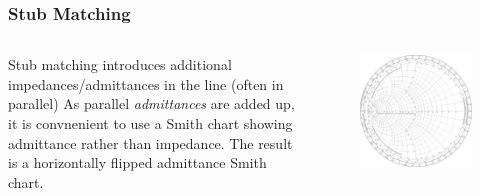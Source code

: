\documentclass[10pt, compress]{beamer}
\begin{document}
\begin{frame}
    \frametitle{Stub Matching}
\begin{columns}[T]
    \begin{column}[]{.4\textwidth}
        \begin{outline}
            \1 Stub matching introduces additional impedances/admittances in the line (often in parallel)
            \1 As parallel \textit{admittances} are added up, it is convnenient to use a Smith chart showing admittance rather than impedance. 
            \2 The result is a horizontally flipped admittance Smith chart.
        \end{outline}  
    \end{column}
    \begin{column}[]{.6\textwidth}
        \begin{figure}[T!]
            \centering
            \includegraphics[width=.9\textwidth]{admittance.pdf}
        \end{figure}
    \end{column}
\end{columns}
\end{frame}
\end{document}
